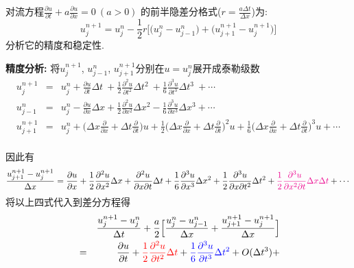 \begin{problem}[问题3]
对流方程$\frac{\partial u}{\partial t} + a\frac{\partial u}{\partial x} = 0 ~(a>0)$ 的前半隐差分格式($r=\frac{a\Delta t}{\Delta x}$)为:
\[
u_j^{n+1} = u_j^n -\frac{1}{2}r
\Big[
\big(u_j^n-u_{j-1}^n\big) + \big(u_{j+1}^{n+1}-u_j^{n+1}\big)
\Big]
\]
分析它的精度和稳定性.
\end{problem}

\begin{solution}
\textbf{精度分析:} 将$u_{j}^{n+1}$, $u_{j-1}^{n}$, $u_{j+1}^{n+1}$分别在$u=u_{j}^{n}$展开成泰勒级数
{\setlength\arraycolsep{2pt}
\begin{eqnarray*}
u_{j}^{n+1} & = & u_{j}^{n}+\frac{\partial u}{\partial t}\Delta t\:+\frac{1}{2}\frac{\partial^{2}u}{\partial t^{2}}\Delta t^{2}\:+\frac{1}{6}\frac{\partial^{3}u}{\partial t^{3}}\Delta t^{3}\:+\cdots\\
u_{j-1}^{n} & = & u_{j}^{n}-\frac{\partial u}{\partial x}\Delta x+\frac{1}{2}\frac{\partial^{2}u}{\partial x^{2}}\Delta x^{2}-\frac{1}{6}\frac{\partial^{3}u}{\partial x^{3}}\Delta x^{3}+\cdots\\
u_{j+1}^{n+1} & = & u_{j}^{n}+\Big(\Delta x\frac{\partial}{\partial x}+\Delta t\frac{\partial}{\partial t}\Big)u+\frac{1}{2}\Big(\Delta x\frac{\partial}{\partial x}+\Delta t\frac{\partial}{\partial t}\Big)^{2}u+\frac{1}{6}\Big(\Delta x\frac{\partial}{\partial x}+\Delta t\frac{\partial}{\partial t}\Big)^{3}u+\cdots
\end{eqnarray*}}\\
\noindent 因此有
\[
\frac{u_{j+1}^{n+1}-u_{j}^{n+1}}{\Delta x}=\frac{\partial u}{\partial x}+\frac{1}{2}\frac{\partial^{2}u}{\partial x^{2}}\Delta x+\frac{\partial^{2}u}{\partial x\partial t}\Delta t+\frac{1}{6}\frac{\partial^{3}u}{\partial x^{3}}\Delta x^{2}+\frac{1}{2}\frac{\partial^{3}u}{\partial x\partial t^{2}}\Delta t^{2}+\textcolor{magenta}{\frac{1}{2}\frac{\partial^{3}u}{\partial x^{2}\partial t}\Delta x\Delta t}+\cdots
\]
将以上四式代入到差分方程得
{\setlength\arraycolsep{2pt}
\begin{eqnarray*}
 &  & \frac{u_{j}^{n+1}-u_{j}^{n}}{\Delta t}+\frac{a}{2}\Big[\frac{u_{j}^{n}-u_{j-1}^{n}}{\Delta x}+\frac{u_{j+1}^{n+1}-u_{j}^{n+1}}{\Delta x}\Big]\\
 & = & \frac{\partial u}{\partial t}+\textcolor{red}{\frac{1}{2}\frac{\partial^{2}u}{\partial t^{2}}\Delta t}+\textcolor{blue}{\frac{1}{6}\frac{\partial^{3}u}{\partial t^{3}}\Delta t^{2}}+O(\Delta t^{3})+

\end{eqnarray*}}
\end{solution}
